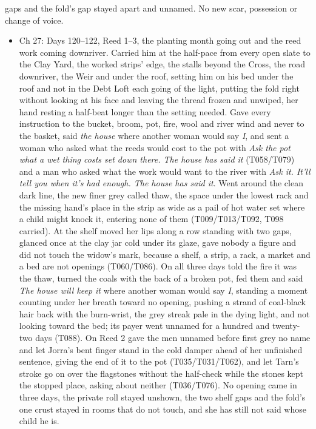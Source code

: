 \documentclass{design/chronicle}
\begin{document}
{\begin{itemize}[leftmargin=1.4em,itemsep=1pt,topsep=3pt,parsep=0pt]
gaps and the fold’s gap stayed apart and unnamed. No new scar, possession or change of voice.

\end{itemize}

\begin{itemize}[leftmargin=1.4em,itemsep=1pt,topsep=3pt,parsep=0pt]

\item Ch 27: Days 120–122, Reed 1–3, the planting month going out and the reed work coming downriver. Carried him at the half-pace from every open slate to the Clay Yard, the worked strips’ edge, the stalls beyond the Cross, the road downriver, the Weir and under the roof, setting him on his bed under the roof and not in the Debt Loft each going of the light, putting the fold right without looking at his face and leaving the thread frozen and unwiped, her hand resting a half-beat longer than the setting needed. Gave every instruction to the bucket, broom, pot, fire, wool and river wind and never to the basket, said \emph{the house} where another woman would say \emph{I}, and sent a woman who asked what the reeds would cost to the pot with \emph{Ask the pot what a wet thing costs set down there. The house has said it} (T058/T079) and a man who asked what the work would want to the river with \emph{Ask it. It’ll tell you when it’s had enough. The house has said it}. Went around the clean dark line, the new finer grey called thaw, the space under the lowest rack and the missing hand’s place in the strip as wide as a pail of hot water set where a child might knock it, entering none of them (T009/T013/T092, T098 carried). At the shelf moved her lips along a row standing with two gaps, glanced once at the clay jar cold under its glaze, gave nobody a figure and did not touch the widow’s mark, because a shelf, a strip, a rack, a market and a bed are not openings (T060/T086). On all three days told the fire it was the thaw, turned the coals with the back of a broken pot, fed them and said \emph{The house will keep it} where another woman would say \emph{I}, standing a moment counting under her breath toward no opening, pushing a strand of coal-black hair back with the burn-wrist, the grey streak pale in the dying light, and not looking toward the bed; its payer went unnamed for a hundred and twenty-two days (T088). On Reed 2 gave the men unnamed before first grey no name and let Jorra’s bent finger stand in the cold damper ahead of her unfinished sentence, giving the end of it to the pot (T035/T031/T062), and let Tarn’s stroke go on over the flagstones without the half-check while the stones kept the stopped place, asking about neither (T036/T076). No opening came in three days, the private roll stayed unshown, the two shelf gaps and the fold’s one crust stayed in rooms that do not touch, and she has still not said whose child he is.


\end{itemize}}
\end{document}

